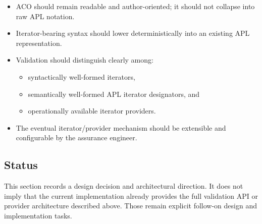 \documentclass[12pt,twoside,a4paper]{article}
\begin{document}
\begin{itemize}
  \item ACO should remain readable and author-oriented; it should not collapse into raw APL notation.
  \item Iterator-bearing syntax should lower deterministically into an existing APL representation.
  \item Validation should distinguish clearly among:
  \begin{itemize}
    \item syntactically well-formed iterators,
    \item semantically well-formed APL iterator designators, and
    \item operationally available iterator providers.
  \end{itemize}
  \item The eventual iterator/provider mechanism should be extensible and configurable by the assurance engineer.
\end{itemize}

\subsection{Status}

This section records a design decision and architectural direction.
It does not imply that the current implementation already provides the full validation API or provider architecture described above.
Those remain explicit follow-on design and implementation tasks.
\end{document}
